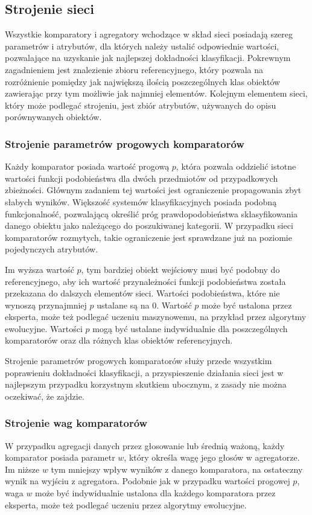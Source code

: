 \documentclass{pracalicmgr}
\begin{document}
    \subsection{Strojenie sieci}
    Wszystkie komparatory i agregatory wchodzące w skład sieci posiadają szereg parametrów i atrybutów, dla których należy ustalić odpowiednie wartości, pozwalające na uzyskanie jak najlepszej dokładności klasyfikacji. Pokrewnym zagadnieniem jest znalezienie zbioru referencyjnego, który pozwala na rozróżnienie pomiędzy jak największą ilością poszczególnych klas obiektów zawierając przy tym możliwie jak najmniej elementów. Kolejnym elementem sieci, który może podlegać strojeniu, jest zbiór atrybutów, używanych do opisu porównywanych obiektów.
    \subsubsection{Strojenie parametrów progowych komparatorów}
    Każdy komparator posiada wartość progową $p$, która pozwala oddzielić istotne wartości funkcji podobieństwa dla dwóch przedmiotów od przypadkowych zbieżności. Głównym zadaniem tej wartości jest ograniczenie propagowania zbyt słabych wyników. Większość systemów klasyfikacyjnych posiada podobną funkcjonalność, pozwalającą określić próg prawdopodobieństwa sklasyfikowania danego obiektu jako należącego do poszukiwanej kategorii. W przypadku sieci komparatorów rozmytych, takie ograniczenie jest sprawdzane już na poziomie pojedynczych atrybutów. 
    
    Im wyższa wartość $p$, tym bardziej obiekt wejściowy musi być podobny do referencyjnego, aby ich wartość przynależności funkcji podobieństwa została przekazana do dalszych elementów sieci. Wartości podobieństwa, które nie wynoszą przynajmniej $p$ ustalane są na $0$.
    Wartość $p$ może być ustalona przez eksperta, może też podlegać uczeniu maszynowemu, na przykład przez algorytmy ewolucyjne. Wartości $p$ mogą być ustalane indywidualnie dla poszczególnych komparatorów oraz dla różnych klas obiektów referencyjnych. 
    
    Strojenie parametrów progowych komparatorów służy przede wszystkim poprawieniu dokładności klasyfikacji, a przyspieszenie działania sieci jest w najlepszym przypadku korzystnym skutkiem ubocznym, z zasady nie można oczekiwać, że zajdzie.
    \subsubsection{Strojenie wag komparatorów}
    W przypadku agregacji danych przez głosowanie lub średnią ważoną, każdy komparator posiada parametr $w$, który określa wagę jego głosów w agregatorze. Im niższe $w$ tym mniejszy wpływ wyników z danego komparatora, na ostateczny wynik na wyjściu z agregatora. Podobnie jak w przypadku wartości progowej $p$, waga $w$ może być indywidualnie ustalona dla każdego komparatora przez eksperta, może też podlegać uczeniu przez algorytmy ewolucyjne.
    
\end{document}
